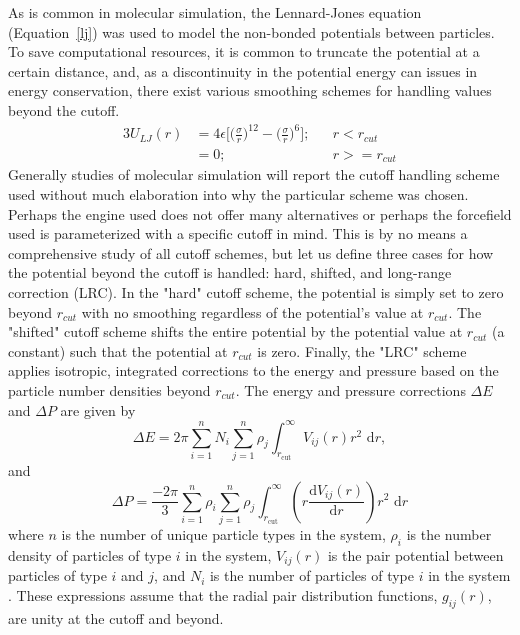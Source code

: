 As is common in molecular simulation, the Lennard-Jones equation (Equation~\eqref{lj}) was used to model the non-bonded potentials between particles.
To save computational resources, it is common to truncate the potential at a certain distance, and, as a discontinuity in the potential energy can issues in energy conservation, there exist various smoothing schemes for handling values beyond the cutoff.
\begin{alignat}{3}
U_{LJ}(r) & = 4\epsilon\bigg[\bigg(\frac{\sigma}{r}\bigg)^{12} - \bigg(\frac{\sigma}{r}\bigg)^{6}\bigg]; && r<r_{cut} 
    \label{lj} \\
& = 0; && r>=r_{cut}
    \nonumber
\end{alignat}
Generally studies of molecular simulation will report the cutoff handling scheme used without much elaboration into why the particular scheme was chosen.
Perhaps the engine used does not offer many alternatives or perhaps the forcefield used is parameterized with a specific cutoff in mind.
This is by no means a comprehensive study of all cutoff schemes, but let us define three cases for how the potential beyond the cutoff is handled: hard, shifted, and long-range correction (LRC). 
In the "hard" cutoff scheme, the potential is simply set to zero beyond $r_{cut}$ with no smoothing regardless of the potential’s value at $r_{cut}$.
The "shifted" cutoff scheme shifts the entire potential by the potential value at $r_{cut}$ (a constant) such that the potential at $r_{cut}$ is zero.
Finally, the "LRC" scheme applies isotropic, integrated corrections to the energy and pressure based on the particle number densities beyond $r_{cut}$.
The energy and pressure corrections $\Delta E$ and $\Delta P$ are given by
\begin{equation}\label{lrc_e}
    \Delta E = 2\pi \sum_{i=1}^{n} N_i \sum_{j=1}^{n} \rho_j
    \int_{r_\mathrm{cut}}^{\infty} V_{ij}(r) r^2\,\,\mathrm{d}r, 
\end{equation}
and
\begin{equation}\label{lrc_p}
    \Delta P = \frac{-2\pi}{3} \sum_{i=1}^{n} \rho_i \sum_{j=1}^{n} \rho_j
    \int_{r_\mathrm{cut}}^{\infty} \left( r
    \frac{\mathrm{d}V_{ij}(r)}{\mathrm{d}r} \right) r^2 \,\,\mathrm{d}r  
\end{equation}
where $n$ is the number of unique particle types in the system, $\rho_{i}$ is the number density of particles of type $i$ in the system, $V_{ij}(r)$ is the pair potential between particles of type $i$ and $j$, and $N_{i}$ is the number of particles of type $i$ in the system \citep{frenkel2001understanding, Sun1998}.
These expressions assume that the radial pair distribution functions, $g_{ij}(r)$, are unity at the cutoff and beyond. 

